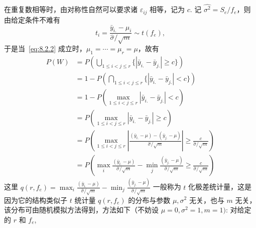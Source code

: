在重复数相等时，由对称性自然可以要求诸 $\varepsilon_{ij}$ 相等，记为 $c$. 记 $\hat{\sigma^2} = S_e/f_e$，则由给定条件不难有
\begin{equation*}
  t_i = \frac{\bar{y}_{i.} - \mu_i}{\hat{\sigma}/\sqrt{m}} \sim t(f_e),
\end{equation*}
于是当~\eqref{eq:8.2.2} 成立时，$\mu_1 = \cdots = \mu_r = \mu$，故有
\begin{align*}
  P(W)  & = P\left(\bigcup_{1\leq i < j \leq r} \{|\bar{y}_{i.} - \bar{y}_{j.}| \geq c\}\right)\\
        & = 1- P\left(\bigcap_{1\leq i < j \leq r} \{|\bar{y}_{i.} - \bar{y}_{j.}| < c\}\right)\\
        & = 1 - P(\max_{1\leq i < j \leq r} |\bar{y}_{i.} - \bar{y}_{j.}| < c) \\
        & = P(\max_{1\leq i < j \leq r} |\bar{y}_{i.} - \bar{y}_{j.}| \geq c) \\
        & = P\left(\max_{1 \leq i < j \leq r} \left|\frac{(\bar{y}_{i.}-\mu) - (\bar{y}_{j.}-\mu)}{\hat{\sigma}/\sqrt{m}}\right|\geq \frac{c}{\hat{\sigma}/\sqrt{m}}\right)\\
        & = P\left(\max_{i} \frac{(\bar{y}_{i.}-\mu)}{\hat{\sigma}/\sqrt{m}} - \min_{j}\frac{(\bar{y}_{j.}-\mu)}{\hat{\sigma}/\sqrt{m}}\geq \frac{c}{\hat{\sigma}/\sqrt{m}}\right)
\end{align*}
这里 $q(r,f_e)=\max_{i} \frac{(\bar{y}_{i.}-\mu)}{\hat{\sigma}/\sqrt{m}} - \min_{j} \frac{(\bar{y}_{j.}-\mu)}{\hat{\sigma}/\sqrt{m}}$ 一般称为 $t$ 化极差统计量，这是因为它的结构类似子 $t$ 统计量 $q(r,f_e)$ 的分布与参数 $\mu, \sigma^2$ 无关，也与 $m$ 无关，该分布可由随机模拟方法得到，方法如下（不妨设 $\mu=0, \sigma^2=1, m=1)$: 对给定的 $r$ 和 $f_e$,
